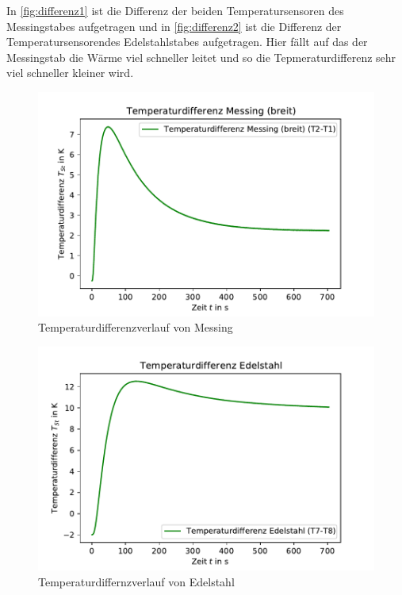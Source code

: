 In \autoref{fig:differenz1} ist die Differenz der beiden Temperatursensoren des Messingstabes
aufgetragen und in \autoref{fig:differenz2} ist die Differenz der Temperatursensorendes Edelstahlstabes  aufgetragen.
Hier fällt auf das der Messingstab die Wärme viel schneller leitet und so die Tepmeraturdifferenz sehr viel schneller
kleiner wird.  
    \begin{figure}
        \centering
        \includegraphics{diffmess.pdf}
        \caption{Temperaturdifferenzverlauf von Messing}
        \label{fig:differenz1}
      \end{figure}
    \begin{figure}
        \centering
        \includegraphics{diffed.pdf}
        \caption{Temperaturdiffernzverlauf von Edelstahl}
        \label{fig:differenz}
      \end{figure}

